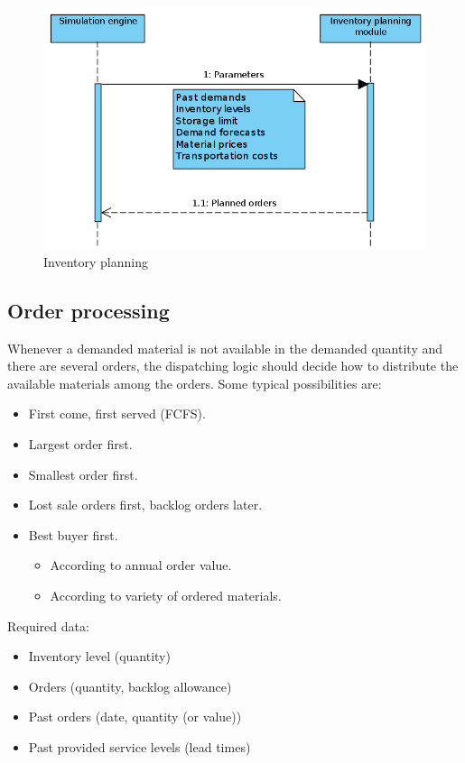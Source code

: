 \documentclass{article}
\begin{document}
\begin{figure}[ht!]
	\center
	\includegraphics[width=.7\textwidth]{seq_inventory.png} 
	\caption{Inventory planning}\label{fig:seq_inventory}
\end{figure}


\subsection{Order processing}

Whenever a demanded material is not available in the demanded quantity and there are several orders, the dispatching logic should decide how to distribute the available materials among the orders. Some typical possibilities are:
\begin{itemize}
\item First come, first served (FCFS).
\item Largest order first.
\item Smallest order first.
\item Lost sale orders first, backlog orders later.
\item Best buyer first.
	\begin{itemize}
	\item According to annual order value.
	\item According to variety of ordered materials.
	\end{itemize}
\end{itemize}

\noindent Required data:
\begin{itemize}
\item Inventory level (quantity)
\item Orders (quantity, backlog allowance)
\item Past orders (date, quantity (or value))
\item Past provided service levels (lead times)
\end{itemize}
\end{document}
